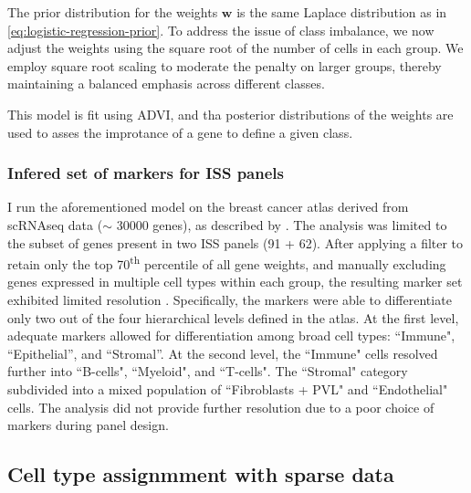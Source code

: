 The prior distribution for the weights $\mathbf{w}$ is the same Laplace distribution as in \cref{eq:logistic-regression-prior}. To address the issue of class imbalance, we now adjust the weights using the square root of the number of cells in each group. We employ square root scaling to moderate the penalty on larger groups, thereby maintaining a balanced emphasis across different classes.

This model is fit using \ac{ADVI}, and tha posterior distributions of the weights are used to asses the improtance of a gene to define a given class. 


\subsubsection*{Infered set of markers for \ac{ISS} panels}

I run the aforementioned model on the breast cancer atlas derived from \ac{scRNAseq} data ($\sim$ 30000 genes), as described by \textcite{Wu2021-uq}. The analysis was limited to the subset of genes present in two \ac{ISS} panels (91 + 62). After applying a filter to retain only the top 70\textsuperscript{th} percentile of all gene weights, and manually excluding genes expressed in multiple cell types within each group, the resulting marker set exhibited limited resolution . Specifically, the markers were able to differentiate only two out of the four hierarchical levels defined in the atlas. At the first level, adequate markers allowed for differentiation among broad cell types: ``Immune", ``Epithelial'', and ``Stromal''. At the second level, the ``Immune" cells resolved further into ``B-cells", ``Myeloid", and ``T-cells". The ``Stromal" category subdivided into a mixed population of ``Fibroblasts + PVL" and ``Endothelial" cells. The analysis did not provide further resolution due to a poor choice of markers during panel design.

\subsection{Cell type assignmment with sparse data}
\label{sec:modalities-celltype}

